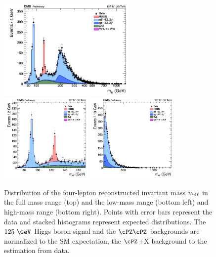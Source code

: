{%
\begin{figure}[!htb]
	\vspace*{0.3cm}
	\begin{center}
		\includegraphics[width=0.6\textwidth]{Figures/KinDistr/M4lMain_Unblinded_4l_InclusiveRun2.png} \\ %
		\includegraphics[width=0.4\textwidth]{Figures/KinDistr/M4lMainZoomed_Unblinded_4l_InclusiveRun2.png} %
		\includegraphics[width=0.4\textwidth]{Figures/KinDistr/M4lMainHighMass_Unblinded_4l_InclusiveRun2.png} %
		\caption{Distribution of the four-lepton reconstructed invariant mass $m_{4\ell}$ in the full mass range (top) and the low-mass range (bottom left) and high-mass range (bottom right). Points with error bars represent the data and stacked histograms represent expected distributions. The $125~\GeV$ Higgs boson signal and the $\cPZ\cPZ$ backgrounds are normalized to the SM expectation, the $\cPZ$+X background to the estimation from data.
			\label{fig:Mass4lC}}
	\end{center}
\end{figure}

}
